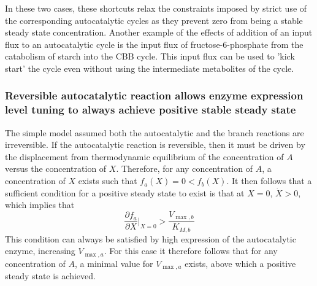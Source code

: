     \iftoggle{elifesubmission} {
  Interestingly, we find that in the two autocatalytic cycles shown in Figure \ref{fig:realautocatal}-figure supplements 1 and 2, reactions that generate direct input flux into the cycle exist.
  In the ribose-5P assimilating autocatalytic cycle (Figure \ref{fig:realautocatal}-figure supplement 1), the rpi reaction serves as a shortcut, allowing input flux directly from ribose-5P into the cycle.
  In the glycerone-phosphate assimilating cycle (Figure \ref{fig:realautocatal}-figure supplement 2), the tpi reaction similarly serves as such a shortcut.} {
  Interestingly, we find that in the two autocatalytic cycles shown in figures \ref{fig:extrasamps1} and \ref{fig:extrasamps2}, reactions that generate direct input flux into the cycle exist.
  In the ribose-5P assimilating autocatalytic cycle (Figure \ref{fig:extrasamps1}), the rpi reaction serves as a shortcut, allowing input flux directly from ribose-5P into the cycle.
  In the glycerone-phosphate assimilating cycle (Figure \ref{fig:extrasamps2}), the tpi reaction similarly serves as such a shortcut.}
  In these two cases, these shortcuts relax the constraints imposed by strict use of the corresponding autocatalytic cycles as they prevent zero from being a stable steady state concentration.
    Another example of the effects of addition of an input flux to an autocatalytic cycle is the input flux of fructose-6-phosphate from the catabolism of starch into the CBB cycle.
    This input flux can be used to 'kick start' the cycle even without using the intermediate metabolites of the cycle.

    \subsubsection{Reversible autocatalytic reaction allows enzyme expression level tuning to always achieve positive stable steady state}
    The simple model assumed both the autocatalytic and the branch reactions are irreversible.
    If the autocatalytic reaction is reversible, then it must be driven by the displacement from thermodynamic equilibrium of the concentration of $A$ versus the concentration of $X$.
    Therefore, for any concentration of $A$, a concentration of $X$ exists such that $f_a(X)=0<f_b(X)$.
    It then follows that a sufficient condition for a positive steady state to exist is that at $X=0$, $\dot{X}>0$, which implies that 
    \begin{equation*}
    \frac{\partial f_a}{\partial X}\Big\vert_{X=0}>\frac{V_{\max,b}}{K_{M,b}}
    \end{equation*}
    This condition can always be satisfied by high expression of the autocatalytic enzyme, increasing $V_{\max,a}$.
    For this case it therefore follows that for any concentration of $A$, a minimal value for $V_{\max,a}$ exists, above which a positive steady state is achieved.
